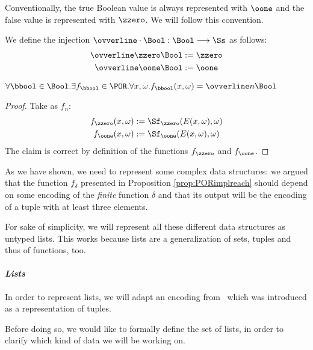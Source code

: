 \begin{conditional}{\notappendix}
  Conventionally, the true Boolean value is always represented with $\oone$ and
  the false value is represented with $\zzero$.
  We will follow this convention.

  \begin{defn}
    We define the injection $\ovverline \cdot \Bool:  \Bool \longrightarrow \Ss$
    as follows:
    \begin{align*}
      \ovverline \zzero \Bool &:= \zzero\\
      \ovverline \oone \Bool &:= \oone
    \end{align*}
  \end{defn}

  \begin{remark}
    $\forall \bbool \in \Bool. \exists f_\bbool \in \POR. \forall x, \omega.
    f_\bbool(x, \omega)= \ovverline n \Bool$
  \end{remark}
  \begin{proof}
    Take as $f_n$:
    \begin{align*}
      {f_{\zzero}}(x, \omega)&:= \Sf_\zzero(E(x, \omega),\omega)\\
      {f_\oone}(x, \omega) &:= \Sf_\oone(E(x, \omega),\omega)
    \end{align*}
    The claim is correct by definition of the functions $f_\zzero$ and $f_\oone$.
  \end{proof}

  As we have shown, we need to represent some complex data structures: we argued
  that the function $f_\delta$ presented in Proposition \ref{prop:PORimplreach}
  should depend on some encoding of the \emph{finite} function $\delta$ and that
  its output will be the encoding of a tuple with at least three elements.

  For sake of simplicity, we will represent all these different data structures
  as untyped lists. This works because lists are a generalization of sets,
  tuples and thus of functions, too.
\linebreak


  \paragraph{\emph{Lists}}


  In order to represent lists, we will adapt an encoding
  from~\cite[p. 183]{Odifreddi} which was introduced as a representation of tuples.

  Before doing so, we would like to formally define the set of lists, in order
  to clarify which kind of data we will be working on.


\end{conditional}
